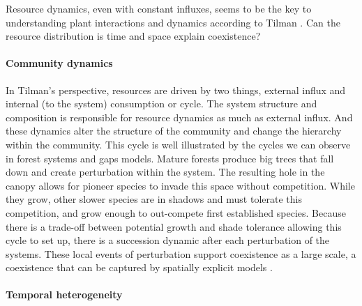 
Resource dynamics, even with constant influxes, seems to be the key to understanding plant interactions and dynamics according to Tilman \cite{tilman_plant_1988}. Can the resource distribution is time and space explain coexistence?

\paragraph{Community dynamics}

In Tilman's perspective, resources are driven by two things, external influx and internal (to the system) consumption or cycle. The system structure and composition is responsible for resource dynamics as much as external influx. And these dynamics alter the structure of the community and change the hierarchy within the community. This cycle is well illustrated by the cycles we can observe in forest systems and gaps models. Mature forests produce big trees that fall down and create perturbation within the system. The resulting hole in the canopy allows for pioneer species to invade this space without competition. While they grow, other slower species are in shadows and must tolerate this competition, and grow enough to out-compete first established species. Because there is a trade-off between potential growth and shade tolerance allowing this cycle to set up, there is a succession dynamic after each perturbation of the systems. These local events of perturbation support coexistence as a large scale, a coexistence that can be captured by spatially explicit models \cite{chave_study_1999, falster_plant:_2016}.

\paragraph{Temporal heterogeneity}


